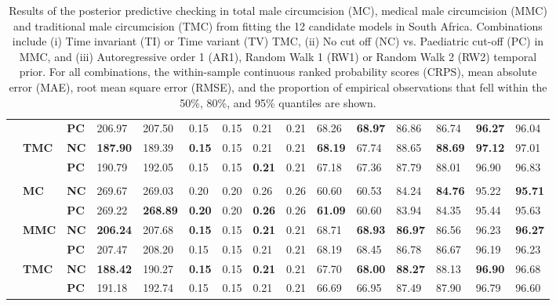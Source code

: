 {\begin{table}[H]
\begin{tabular}{>{\bfseries}p{0.05cm} p{0.85cm} p{0.75cm} C{1.25cm} C{1.25cm} C{1.25cm} C{1.25cm} C{1.25cm} C{1.25cm} C{1.25cm} C{1.25cm} C{1.25cm} C{1.25cm} C{1.25cm} C{1.25cm}}
  &  & \bf PC & 206.97 & 207.50 &   0.15 &   0.15 &   0.21 &   0.21 &  68.26 & \bf 68.97 &  86.86 &  86.74 & \bf 96.27 &  96.04\\[3pt] 
  & \bf TMC & \bf NC & \bf187.90 & 189.39 & \bf  0.15 &   0.15 &   0.21 &   0.21 & \bf 68.19 &  67.74 &  88.65 & \bf 88.69 & \bf 97.12 &  97.01\\ 
  &  & \bf PC & 190.79 & 192.05 &   0.15 &   0.15 & \bf  0.21 &   0.21 &  67.18 &  67.36 &  87.79 &  88.01 &  96.90 &  96.83\\[3pt] 
     \\ 
 & \bf MC & \bf NC & 269.67 & 269.03 &   0.20 &   0.20 &   0.26 &   0.26 &  60.60 &  60.53 &  84.24 & \bf 84.76 &  95.22 & \bf 95.71\\ 
  &  & \bf PC & 269.22 & \bf268.89 & \bf  0.20 &   0.20 & \bf  0.26 &   0.26 & \bf 61.09 &  60.60 &  83.94 &  84.35 &  95.44 &  95.63\\[3pt] 
  & \bf MMC & \bf NC & \bf206.24 & 207.68 & \bf  0.15 &   0.15 & \bf  0.21 &   0.21 &  68.71 & \bf 68.93 & \bf 86.97 &  86.56 &  96.23 & \bf 96.27\\ 
  &  & \bf PC & 207.47 & 208.20 &   0.15 &   0.15 &   0.21 &   0.21 &  68.19 &  68.45 &  86.78 &  86.67 &  96.19 &  96.23\\[3pt] 
  & \bf TMC & \bf NC & \bf188.42 & 190.27 & \bf  0.15 &   0.15 & \bf  0.21 &   0.21 &  67.70 & \bf 68.00 & \bf 88.27 &  88.13 & \bf 96.90 &  96.68\\ 
  &  & \bf PC & 191.18 & 192.74 &   0.15 &   0.15 &   0.21 &   0.21 &  66.69 &  66.95 &  87.49 &  87.90 &  96.79 &  96.60\\[3pt] 
  \hline 
  \end{tabular} 
  \caption{Results of the posterior predictive checking in total male circumcision (MC), medical male circumcision (MMC) and traditional male circumcision (TMC) from fitting the 12 candidate models in South Africa. Combinations include (i) Time invariant (TI) or Time variant (TV) TMC, (ii) No cut off (NC) vs. Paediatric cut-off (PC) in MMC, and (iii) Autoregressive order 1 (AR1), Random Walk 1 (RW1) or Random Walk 2 (RW2) temporal prior. For all combinations, the within-sample continuous ranked probability scores (CRPS), mean absolute error (MAE), root mean square error (RMSE), and the proportion of empirical observations that fell within the 50\%, 80\%, and 95\% quantiles are shown.} 
  \label{tab::PPC1ZAF} 
\end{table}} 

